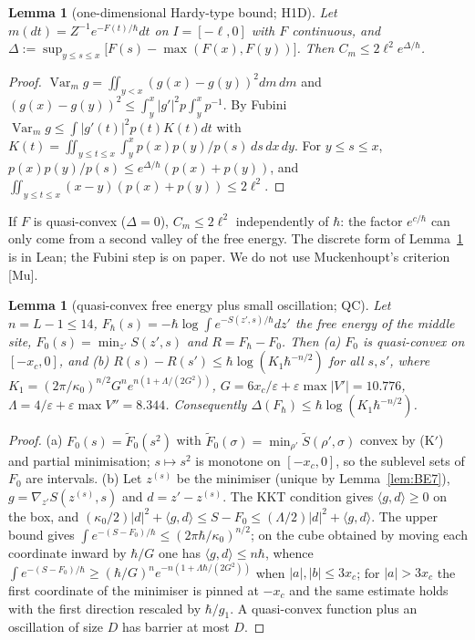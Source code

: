 \documentclass[11pt,a4paper]{article}
\newtheorem{lemma}[theorem]{Lemma}
\theoremstyle{definition}
\theoremstyle{remark}
\newcommand{\Var}{\operatorname{Var}}
\newcommand{\xc}{x_c}
\begin{document}
\begin{lemma}[one-dimensional Hardy-type bound; H1D]\label{lem:H1D}
Let $m(dt)=Z^{-1}e^{-F(t)/\hbar}dt$ on $I=[-\ell,0]$ with $F$ continuous, and $\Delta:=\sup_{y\le s\le x}\big[F(s)-\max(F(x),F(y))\big]$. Then $C_m\le2\ell^2e^{\Delta/\hbar}$.
\end{lemma}
\begin{proof}
$\Var_mg=\iint_{y<x}(g(x)-g(y))^2dm\,dm$ and $(g(x)-g(y))^2\le\int_y^x|g'|^2p\int_y^xp^{-1}$. By Fubini $\Var_mg\le\int|g'(t)|^2p(t)K(t)dt$ with $K(t)=\iint_{y\le t\le x}\int_y^xp(x)p(y)/p(s)\,ds\,dx\,dy$. For $y\le s\le x$, $p(x)p(y)/p(s)\le e^{\Delta/\hbar}(p(x)+p(y))$, and $\iint_{y\le t\le x}(x-y)(p(x)+p(y))\le2\ell^2$.
\end{proof}
If $F$ is quasi-convex ($\Delta=0$), $C_m\le2\ell^2$ independently of $\hbar$: the factor $e^{c/\hbar}$ can only come from a second valley of the free energy. The discrete form of Lemma~\ref{lem:H1D} is in Lean; the Fubini step is on paper. We do not use Muckenhoupt's criterion [Mu].

\begin{lemma}[quasi-convex free energy plus small oscillation; QC]\label{lem:QC}
Let $n=L-1\le14$, $F_\hbar(s)=-\hbar\log\int e^{-S(z',s)/\hbar}dz'$ the free energy of the middle site, $F_0(s)=\min_{z'}S(z',s)$ and $R=F_\hbar-F_0$. Then \textup{(a)} $F_0$ is quasi-convex on $[-\xc,0]$, and \textup{(b)} $R(s)-R(s')\le\hbar\log(K_1\hbar^{-n/2})$ for all $s,s'$, where $K_1=(2\pi/\kappa_0)^{n/2}G^ne^{n(1+\Lambda/(2G^2))}$, $G=6\xc/\varepsilon+\varepsilon\max|V'|=10.776$, $\Lambda=4/\varepsilon+\varepsilon\max V''=8.344$. Consequently $\Delta(F_\hbar)\le\hbar\log(K_1\hbar^{-n/2})$.
\end{lemma}
\begin{proof}
(a) $F_0(s)=\tilde F_0(s^2)$ with $\tilde F_0(\sigma)=\min_{\rho'}\tilde S(\rho',\sigma)$ convex by (K$'$) and partial minimisation; $s\mapsto s^2$ is monotone on $[-\xc,0]$, so the sublevel sets of $F_0$ are intervals.
(b) Let $z^{(s)}$ be the minimiser (unique by Lemma~\ref{lem:BE7}), $g=\nabla_{z'}S(z^{(s)},s)$ and $d=z'-z^{(s)}$. The KKT condition gives $\langle g,d\rangle\ge0$ on the box, and $(\kappa_0/2)|d|^2+\langle g,d\rangle\le S-F_0\le(\Lambda/2)|d|^2+\langle g,d\rangle$. The upper bound gives $\int e^{-(S-F_0)/\hbar}\le(2\pi\hbar/\kappa_0)^{n/2}$; on the cube obtained by moving each coordinate inward by $\hbar/G$ one has $\langle g,d\rangle\le n\hbar$, whence $\int e^{-(S-F_0)/\hbar}\ge(\hbar/G)^ne^{-n(1+\Lambda\hbar/(2G^2))}$ when $|a|,|b|\le3\xc$; for $|a|>3\xc$ the first coordinate of the minimiser is pinned at $-\xc$ and the same estimate holds with the first direction rescaled by $\hbar/g_1$. A quasi-convex function plus an oscillation of size $D$ has barrier at most $D$.
\end{proof}
\end{document}
